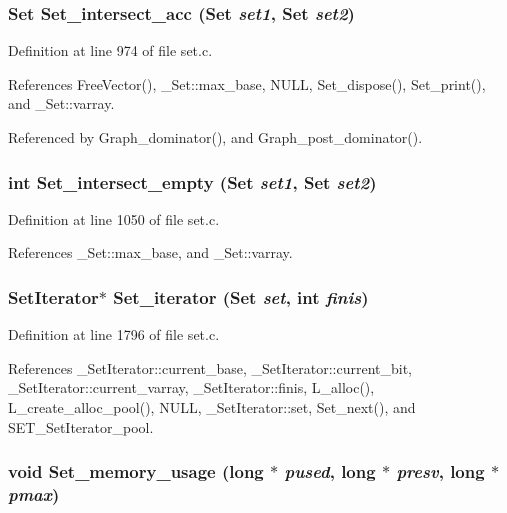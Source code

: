\subsubsection{\setlength{\rightskip}{0pt plus 5cm}\bf{Set} Set\_\-intersect\_\-acc (\bf{Set} {\em set1}, \bf{Set} {\em set2})}\label{set_8c_2bfa394ba01af0edbb2c1e276043b4b2}




Definition at line 974 of file set.c.

References Free\-Vector(), \_\-Set::max\_\-base, NULL, Set\_\-dispose(), Set\_\-print(), and \_\-Set::varray.

Referenced by Graph\_\-dominator(), and Graph\_\-post\_\-dominator().
\subsubsection{\setlength{\rightskip}{0pt plus 5cm}int Set\_\-intersect\_\-empty (\bf{Set} {\em set1}, \bf{Set} {\em set2})}\label{set_8c_416bf3572e2b7533fe551254d969379f}




Definition at line 1050 of file set.c.

References \_\-Set::max\_\-base, and \_\-Set::varray.
\subsubsection{\setlength{\rightskip}{0pt plus 5cm}\bf{Set\-Iterator}$\ast$ Set\_\-iterator (\bf{Set} {\em set}, int {\em finis})}\label{set_8c_49b6b2407db8730bcc43f48e10b60130}




Definition at line 1796 of file set.c.

References \_\-Set\-Iterator::current\_\-base, \_\-Set\-Iterator::current\_\-bit, \_\-Set\-Iterator::current\_\-varray, \_\-Set\-Iterator::finis, L\_\-alloc(), L\_\-create\_\-alloc\_\-pool(), NULL, \_\-Set\-Iterator::set, Set\_\-next(), and SET\_\-Set\-Iterator\_\-pool.
\subsubsection{\setlength{\rightskip}{0pt plus 5cm}void Set\_\-memory\_\-usage (long $\ast$ {\em pused}, long $\ast$ {\em presv}, long $\ast$ {\em pmax})}\label{set_8c_f08a75fa13869226e70109181551825b}




